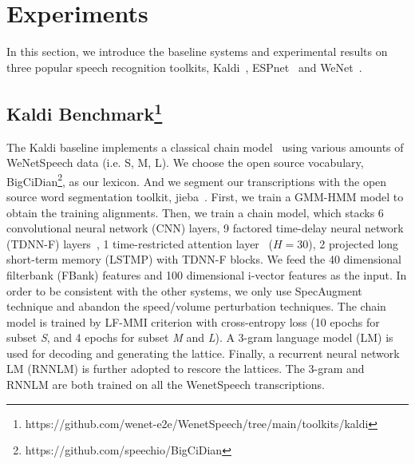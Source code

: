 \documentclass{article}
\begin{document}
\vspace{-0.8em}
\section{Experiments}\label{sec:exp}
\vspace{-1em}
In this section, we introduce the baseline systems and experimental results on three popular speech recognition toolkits, Kaldi~\cite{povey2011kaldi}, ESPnet~\cite{watanabe2018espnet} and WeNet~\cite{yao2021wenet}.

\vspace{-1em}
\subsection[Kaldi Benchmark]{Kaldi Benchmark\footnote{https://github.com/wenet-e2e/WenetSpeech/tree/main/toolkits/kaldi}}
\vspace{-0.5em}
The Kaldi baseline implements a classical chain model~\cite{povey2016purely} using various amounts of WeNetSpeech data (i.e. S, M, L). We choose the open source vocabulary, BigCiDian\footnote{https://github.com/speechio/BigCiDian}, as our lexicon. And we segment our transcriptions with the open source word segmentation toolkit, jieba~\cite{sun2012jieba}. First, we train a GMM-HMM model to obtain the training alignments. Then, we train a chain model, which stacks 6 convolutional neural network (CNN) layers, 9 factored time-delay neural network (TDNN-F) layers~\cite{povey2018semi}, 1 time-restricted attention layer~\cite{povey2018time} ($H = 30$), 2 projected long short-term memory (LSTMP) with TDNN-F blocks. We feed the 40 dimensional filterbank (FBank) features and 100 dimensional i-vector features as the input. In order to be consistent with the other systems, we only use SpecAugment~\cite{park2019specaugment} technique and abandon the speed/volume perturbation techniques. The chain model is trained by LF-MMI criterion with cross-entropy loss (10 epochs for subset \textit{S}, and 4 epochs for subset \textit{M} and \textit{L}). A 3-gram language model (LM) is used for decoding and generating the lattice. Finally, a recurrent neural network LM (RNNLM) is further adopted to rescore the lattices. The 3-gram and RNNLM are both trained on all the WenetSpeech transcriptions.

\vspace{-1em}
\end{document}
